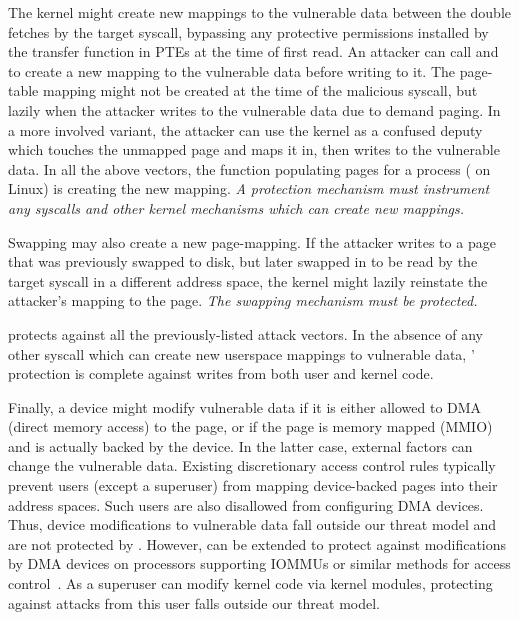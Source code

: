 The kernel might create new mappings to the vulnerable data
between the double fetches by the target syscall, bypassing any 
protective permissions installed by the transfer function in 
PTEs at the time of first read.
An attacker can call  and  to create
a new mapping to the vulnerable data before writing to it.
The page-table mapping might not be created at the time of the malicious
syscall, but lazily when the attacker writes to the vulnerable data
due to demand paging.
In a more involved variant, the attacker can use the kernel as a
confused deputy which touches the unmapped page and maps it in,
then writes to the vulnerable data.
In all the above vectors, the function populating pages for a
process ( on Linux) is creating the new mapping.
\emph{A protection mechanism must instrument any syscalls
and other kernel mechanisms which can create new mappings.}

Swapping may also create a new page-mapping.
If the attacker writes to a page that was previously swapped
to disk, but later swapped in to be read by the target syscall in
a different address space, the kernel might lazily reinstate
the attacker's mapping to the page.
\emph{The swapping mechanism must be protected.}

\midas protects against all the previously-listed attack vectors.
In the absence of any other syscall which can create new userspace
mappings to vulnerable data, \midas' protection is complete
against writes from both user and kernel code.

Finally, a device might modify vulnerable data if it is either
allowed to DMA (direct memory access) to the page, or if the page is memory 
mapped (MMIO) and is actually backed by the device.
In the latter case, external factors can change the vulnerable data.
Existing discretionary access control rules typically prevent users
(except a superuser) from mapping device-backed pages into their
address spaces.
Such users are also disallowed from configuring DMA devices.
Thus, device modifications to vulnerable data fall outside
our threat model and are not protected by \midas.
However, \midas can be extended to protect against modifications by DMA devices
on processors supporting IOMMUs or similar methods for
access control~\cite{olsonbordercontrol}.
As a superuser can modify kernel code via kernel modules, protecting against 
attacks from this user falls outside our threat model.


